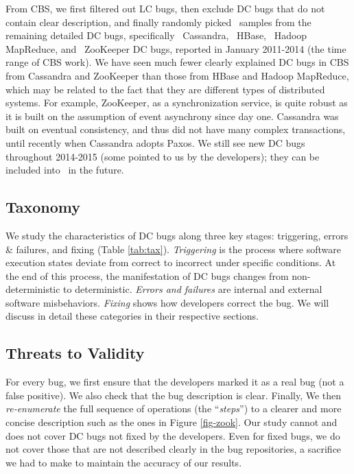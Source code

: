 From CBS, we first filtered out LC bugs, then exclude 
DC bugs that do not contain clear description, and finally
randomly picked \numDcBugs\ samples
from the remaining detailed DC bugs, specifically \numDcCA\
Cassandra, \numDcHB\ HBase, \numDcMR\ Hadoop MapReduce, and \numDcZK\
ZooKeeper DC bugs, reported in January 2011-2014 (the time range of
CBS work).  
We have seen much fewer clearly explained DC bugs in CBS from 
Cassandra and ZooKeeper than those from HBase and Hadoop MapReduce, which 
may be related to the fact that they are different types of distributed
systems.  For example,  ZooKeeper, as a
synchronization service, is quite robust as it is built on the
assumption of event asynchrony since day one. Cassandra was built on
eventual consistency, and thus did not have many complex transactions,
until recently when Cassandra adopts Paxos.  We still see new DC bugs
throughout 2014-2015 (some pointed to us by the developers); they can
be included into \tdc\ in the future.




\subsection{Taxonomy}
\label{met-tax}




We study the characteristics of DC
bugs along three key stages: triggering, errors \& failures, and
fixing (Table \ref{tab:tax}).
%
{\it Triggering} is the process where software execution states
deviate from correct to incorrect under specific conditions.  At the
end of this process, the manifestation of DC bugs changes from
non-deterministic to deterministic.
%
{\it Errors and failures} are internal and external software
misbehaviors.
%
{\it Fixing} shows how developers correct the bug.  We
will discuss in detail these categories in their respective sections.

\subsection{Threats to Validity}
\label{met-valid}

For every bug, we first ensure that the developers marked it as a real bug (not
a false positive).  We also check that the bug description is clear. Finally, We
then {\em re-enumerate} the full sequence of operations (the ``{\em steps}'') to
a clearer and more concise description such as the ones in Figure
\ref{fig-zook}. 
%
Our study cannot and does not cover DC bugs not fixed by the developers.  Even
for fixed bugs, we do not cover those that are not described clearly in the bug
repositories, a sacrifice we had to make to maintain the accuracy of our
results.  

